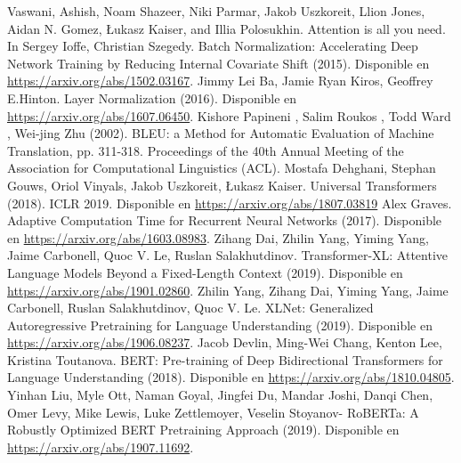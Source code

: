 \documentclass[conference]{IEEEtran}
\begin{document}
\begin{thebibliography}{00}

 Vaswani, Ashish, Noam Shazeer, Niki Parmar, Jakob Uszkoreit, Llion Jones, Aidan N. Gomez, Łukasz Kaiser, and Illia Polosukhin. Attention is all you need. In 
Sergey Ioffe, Christian Szegedy. Batch Normalization: Accelerating Deep Network Training by Reducing Internal Covariate Shift (2015). Disponible en \href{https://arxiv.org/abs/1502.03167}{https://arxiv.org/abs/1502.03167}.
 Jimmy Lei Ba, Jamie Ryan Kiros, Geoffrey E.Hinton. Layer Normalization (2016). Disponible en \href{https://arxiv.org/abs/1607.06450}{https://arxiv.org/abs/1607.06450}.
Kishore Papineni , Salim Roukos , Todd Ward , Wei-jing Zhu (2002). BLEU: a Method for Automatic Evaluation of Machine Translation,  pp. 311-318. Proceedings of the 40th Annual Meeting of the Association for Computational Linguistics (ACL). 
Mostafa Dehghani, Stephan Gouws, Oriol Vinyals, Jakob Uszkoreit, Łukasz Kaiser. Universal Transformers (2018). ICLR 2019. Disponible en \href{https://arxiv.org/abs/1807.03819}{https://arxiv.org/abs/1807.03819}
Alex Graves. Adaptive Computation Time for Recurrent Neural Networks (2017). Disponible en \href{https://arxiv.org/abs/1603.08983}{https://arxiv.org/abs/1603.08983}.
Zihang Dai, Zhilin Yang, Yiming Yang, Jaime Carbonell, Quoc V. Le, Ruslan Salakhutdinov. Transformer-XL: Attentive Language Models Beyond a Fixed-Length Context (2019). Disponible en \href{https://arxiv.org/abs/1901.02860}{https://arxiv.org/abs/1901.02860}. 
Zhilin Yang, Zihang Dai, Yiming Yang, Jaime Carbonell, Ruslan Salakhutdinov, Quoc V. Le. XLNet: Generalized Autoregressive Pretraining for Language Understanding (2019). Disponible en \href{https://arxiv.org/abs/1906.08237}{https://arxiv.org/abs/1906.08237}.
Jacob Devlin, Ming-Wei Chang, Kenton Lee, Kristina Toutanova. BERT: Pre-training of Deep Bidirectional Transformers for Language Understanding (2018). Disponible en \href{https://arxiv.org/abs/1810.04805}{https://arxiv.org/abs/1810.04805}.
Yinhan Liu, Myle Ott, Naman Goyal, Jingfei Du, Mandar Joshi, Danqi Chen, Omer Levy, Mike Lewis, Luke Zettlemoyer, Veselin Stoyanov- RoBERTa: A Robustly Optimized BERT Pretraining Approach (2019). Disponible en \href{https://arxiv.org/abs/1907.11692}{https://arxiv.org/abs/1907.11692}.

\end{thebibliography}
\end{document}
